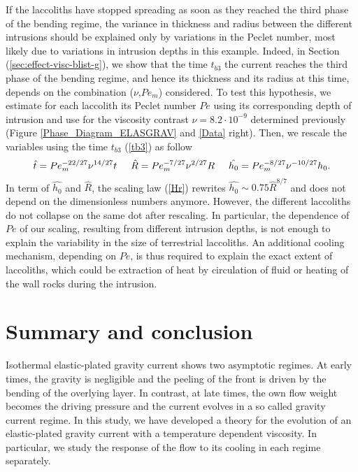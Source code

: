 If the laccoliths  have stopped spreading as soon as  they reached the
third  phase of  the bending  regime,  the variance  in thickness  and
radius between  the different intrusions  should be explained  only by
variations  in the  Peclet number,  most likely  due to  variations in
intrusion   depths    in   this    example.    Indeed,    in   Section
(\ref{sec:effect-visc-blist-g}), we  show that  the time  $t_{b3}$ the
current reaches the  third phase of the bending regime,  and hence its
thickness  and its  radius at  this time,  depends on  the combination
($\nu$,$Pe_m$)  considered.  To  test this  hypothesis, we  estimate for
each laccolith its Peclet number $Pe$ using its corresponding depth of
intrusion and use for the  viscosity contrast $\nu = 8.2\cdot 10^{-9}$
determined   previously   (Figure   \ref{Phase_Diagram_ELASGRAV}   and
\ref{Data}  right). Then,  we  rescale the  variables  using the  time
$t_{b3}$ (\ref{tb3}) as follow
\begin{equation}
  \hat{t}=     Pe_m^{-22/27}\nu^{14/27}t      \hspace{.5cm}     \hat{R}=
  Pe_m^{-7/27}\nu^{2/27}R\hspace{.5cm}                        \hat{h_0}=
  Pe_m^{-8/27}\nu^{-10/27}h_0.
  \label{Scaling2}
\end{equation}
In  term of  $\hat{h_0}$  and $\hat{R}$,  the  scaling law  (\ref{Hr})
rewrites $  \hat{h_0} \sim 0.75\hat{R}^{8/7}$  and does not  depend on
the dimensionless  numbers anymore. However, the  different laccoliths
do not  collapse on the same  dot after rescaling. In  particular, the
dependence of $Pe$  of our scaling, resulting  from different intrusion
depths,  is not  enough  to  explain the  variability  in  the size  of
terrestrial laccoliths. An additional  cooling mechanism, depending on
$Pe$,  is thus  required to  explain the  exact extent  of laccoliths,
which could be  extraction of heat by circulation of  fluid or heating
of the wall rocks during the intrusion.

\section{Summary and conclusion}
\label{sec:conclusion}

Isothermal  elastic-plated   gravity  current  shows   two  asymptotic
regimes.  At early times, the gravity is negligible and the peeling of
the  front is  driven  by  the bending  of  the  overlying layer.   In
contrast,  at late  times, the  own  flow weight  becomes the  driving
pressure  and the  current  evolves  in a  so  called gravity  current
regime.  In this  study, we have developed a theory  for the evolution
of  an elastic-plated  gravity  current with  a temperature  dependent
viscosity. In  particular, we study  the response  of the flow  to its
cooling in each regime separately.

